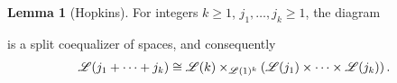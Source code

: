 \documentclass[openany, amssymb, psamsfonts]{amsart}
\theoremstyle{definition}
\newtheorem{lem}{Lemma}[section]
\numberwithin{equation}{section}
\begin{document}
\begin{lem}[Hopkins] \label{lem:hopkins}
For integers $k \geq 1$, $j_1, \dots, j_k \geq 1$, the diagram

 is a split coequalizer of spaces, and consequently
\begin{equation*}
    \mathscr{L}(j_1 + \cdots + j_k) \cong \mathscr{L}(k) \times_{\mathscr{L}(1)^k} \left(\mathscr{L}(j_1) \times \cdots \times \mathscr{L}(j_k)\right).
\end{equation*}
\end{lem}
\end{document}
